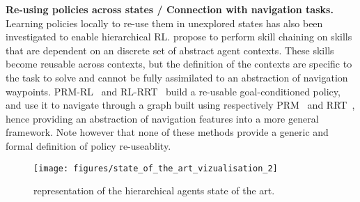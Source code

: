 \textbf{Re-using policies across states / Connection with navigation tasks.}
Learning policies locally to re-use them in unexplored states has also been investigated to enable hierarchical RL.
\citet{konidaris2007building} propose to perform skill chaining on skills that are dependent on an discrete set of
abstract agent contexts.
These skills become reusable across contexts, but the definition of the contexts are specific to the task to solve and
cannot be fully assimilated to an abstraction of navigation waypoints.
PRM-RL~\citep{faust2018prm} and RL-RRT~\citep{chiang2019rl} build a re-usable goal-conditioned policy, and use it to
navigate through a graph built using respectively PRM~\citep{kavraki1996probabilistic} and
RRT~\citep{lavalle1998rapidly}, hence providing an abstraction of navigation features into a more general framework.
Note however that none of these methods provide a generic and formal definition of policy re-useablity.

\begin{figure}%
  \centering
  \texttt{[image: figures/state\_of\_the\_art\_vizualisation\_2]}
  \caption{representation of the hierarchical agents state of the art.}
  \label{figure:stateOfTheArt:vizualisation}
\end{figure}

